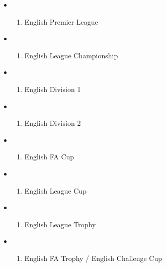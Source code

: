 \documentclass[article]{jss}
\providecommand{\tightlist}{%
  \setlength{\itemsep}{0pt}\setlength{\parskip}{0pt}}
\begin{document}
\begin{itemize}
\item
  \begin{enumerate}
  \def\labelenumi{\arabic{enumi})}
  \tightlist
  \item
    English Premier League
  \end{enumerate}
\item
  \begin{enumerate}
  \def\labelenumi{\arabic{enumi})}
  \setcounter{enumi}{1}
  \tightlist
  \item
    English League Championship
  \end{enumerate}
\item
  \begin{enumerate}
  \def\labelenumi{\arabic{enumi})}
  \setcounter{enumi}{2}
  \tightlist
  \item
    English Division 1
  \end{enumerate}
\item
  \begin{enumerate}
  \def\labelenumi{\arabic{enumi})}
  \setcounter{enumi}{3}
  \tightlist
  \item
    English Division 2
  \end{enumerate}
\item
  \begin{enumerate}
  \def\labelenumi{\arabic{enumi})}
  \setcounter{enumi}{4}
  \tightlist
  \item
    English FA Cup
  \end{enumerate}
\item
  \begin{enumerate}
  \def\labelenumi{\arabic{enumi})}
  \setcounter{enumi}{5}
  \tightlist
  \item
    English League Cup
  \end{enumerate}
\item
  \begin{enumerate}
  \def\labelenumi{\arabic{enumi})}
  \setcounter{enumi}{6}
  \tightlist
  \item
    English League Trophy
  \end{enumerate}
\item
  \begin{enumerate}
  \def\labelenumi{\arabic{enumi})}
  \setcounter{enumi}{7}
  \tightlist
  \item
    English FA Trophy / English Challenge Cup
  \end{enumerate}
\end{itemize}
\end{document}
